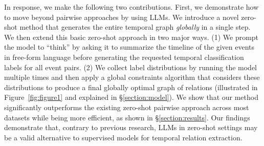 



In response, we make the following two contributions. First, we demonstrate how to move beyond pairwise approaches by using LLMs. We introduce a novel zero-shot method that generates the entire temporal graph \textit{globally} in a single step. 
We then extend this basic zero-shot approach in two major ways. (1) We prompt the model to ``think'' by asking it to summarize the timeline of the given events in free-form language before generating the requested temporal classification labels for all event pairs. (2) We collect label distributions by running the model multiple times and then apply a global constraints algorithm that considers these distributions to produce a final globally optimal graph of relations (illustrated in Figure~\ref{fig:figure1} and explained in §\ref{section:model}).
We show that our method significantly outperforms the existing zero-shot pairwise approach across most datasets while being more efficient, as shown in §\ref{section:results}. Our findings demonstrate that, contrary to previous research, LLMs in zero-shot settings may be a valid alternative to supervised models for temporal relation extraction.


